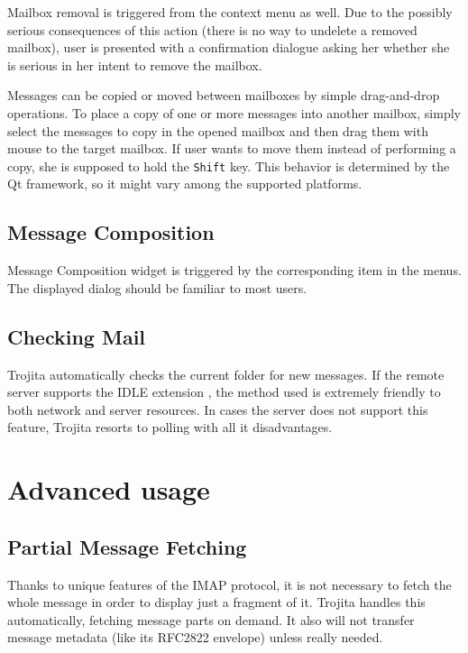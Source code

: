 \documentclass[12pt,notitlepage]{report}
\newcommand{\trojita}{Trojita\xspace}
\begin{document}

Mailbox removal is triggered from the context menu as well.  Due to the possibly
serious consequences of this action (there is no way to undelete a removed
mailbox), user is presented with a confirmation dialogue asking her whether she
is serious in her intent to remove the mailbox.

Messages can be copied or moved between mailboxes by simple drag-and-drop
operations.  To place a copy of one or more messages into another mailbox,
simply select the messages to copy in the opened mailbox and then drag them with
mouse to the target mailbox.  If user wants to move them instead of performing a
copy, she is supposed to hold the {\tt Shift} key.  This behavior is determined
by the Qt framework, so it might vary among the supported platforms.

\subsection{Message Composition}

Message Composition widget is triggered by the corresponding item in the menus.
The displayed dialog should be familiar to most users.

\subsection{Checking Mail}

\trojita automatically checks the current folder for new messages.  If the
remote server supports the IDLE extension \cite{rfc-idle}, the method used is
extremely friendly to both network and server resources.  In cases the server
does not support this feature, \trojita resorts to polling with all it
disadvantages.

\section{Advanced usage}

\subsection{Partial Message Fetching}

Thanks to unique features of the IMAP protocol, it is not necessary to fetch the
whole message in order to display just a fragment of it.  \trojita handles this
automatically, fetching message parts on demand.  It also will not transfer message
metadata (like its RFC2822 envelope) unless really needed.
\end{document}
